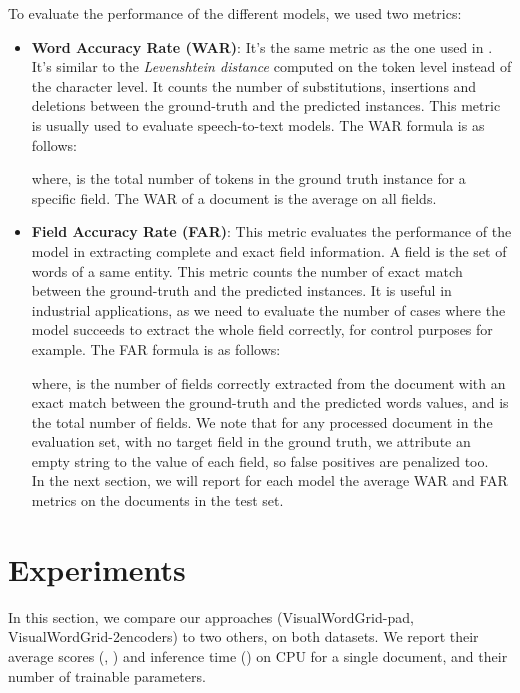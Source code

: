 \documentclass[runningheads]{llncs}
\begin{document}
To evaluate the performance of the different models, we used two metrics:
\begin{itemize}
    \item \textbf{Word Accuracy Rate (WAR)}: It's the same metric as the one used in \cite{chargrid}. It's similar to the \textit{Levenshtein distance}  computed on the token level instead of the character level. It counts the number of substitutions, insertions and deletions between the ground-truth and the predicted instances. This metric is usually used to evaluate speech-to-text models. The WAR formula is as follows:
    

where,  is the total number of tokens in the ground truth instance for a specific field. The WAR of a document is the average on all fields. 

 \item \textbf{Field Accuracy Rate (FAR)}: This metric evaluates the performance of the model in extracting  complete and exact field information. A field is the set of words of a same entity. This metric counts the number of exact match between the ground-truth and the predicted instances. It is useful in industrial applications, as we need to evaluate the number of cases where the model succeeds to extract the whole field correctly, for control purposes for example. The FAR formula is as follows:
 
where,  is the number of fields correctly extracted from the document with an exact match between  the ground-truth and the predicted words values, and  is the total number of fields. We note that for any processed document in the evaluation set, with no target field in the ground truth, we attribute an empty string to the value of each field, so false positives are  penalized too.\\
In the next section, we will report for each model the average WAR and FAR metrics on the documents in the test set.
\end{itemize}



\section{Experiments}
In this section, we compare our approaches (VisualWordGrid-pad, VisualWordGrid-2encoders) to two others, on both datasets. We report their average scores (, ) and inference time ()  on CPU for a single document, and their number of trainable parameters.
\end{document}

